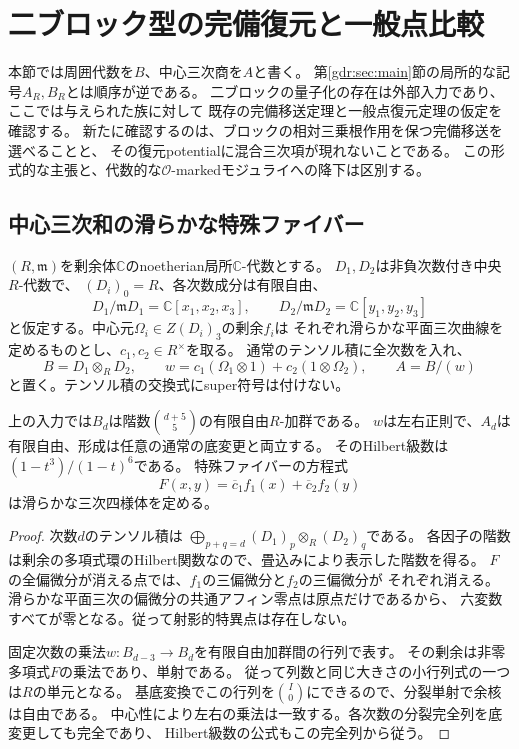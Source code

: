 \section{二ブロック型の完備復元と一般点比較}
\label{tbr:sec:recovery}

本節では周囲代数を$B$、中心三次商を$A$と書く。
第\ref{gdr:sec:main}節の局所的な記号$A_R,B_R$とは順序が逆である。
二ブロックの量子化の存在は外部入力であり、ここでは与えられた族に対して
既存の完備移送定理と一般点復元定理の仮定を確認する。
新たに確認するのは、ブロックの相対三乗根作用を保つ完備移送を選べることと、
その復元potentialに混合三次項が現れないことである。
この形式的な主張と、代数的な$\mathcal O$-markedモジュライへの降下は区別する。

\subsection{中心三次和の滑らかな特殊ファイバー}

$(R,\mathfrak m)$を剰余体$\mathbb C$のnoetherian局所$\mathbb C$-代数とする。
$D_1,D_2$は非負次数付き中央$R$-代数で、
$(D_i)_0=R$、各次数成分は有限自由、
\[
 D_1/\mathfrak mD_1=\mathbb C[x_1,x_2,x_3],\qquad
 D_2/\mathfrak mD_2=\mathbb C[y_1,y_2,y_3]
\]
と仮定する。中心元$\Omega_i\in Z(D_i)_3$の剰余$f_i$は
それぞれ滑らかな平面三次曲線を定めるものとし、$c_1,c_2\in R^\times$を取る。
通常のテンソル積に全次数を入れ、
\begin{equation}\label{tbr:eq:input}
 B=D_1\otimes_RD_2,\qquad
 w=c_1(\Omega_1\otimes1)+c_2(1\otimes\Omega_2),\qquad A=B/(w)
\end{equation}
と置く。テンソル積の交換式にsuper符号は付けない。

\begin{lemma}[二ブロック入力の次数別自由性と正則中心商]
\label{tbr:lem:input}
上の入力では$B_d$は階数$\binom{d+5}{5}$の有限自由$R$-加群である。
$w$は左右正則で、$A_d$は有限自由、形成は任意の通常の底変更と両立する。
そのHilbert級数は$(1-t^3)/(1-t)^6$である。
特殊ファイバーの方程式
\[
 F(x,y)=\overline c_1f_1(x)+\overline c_2f_2(y)
\]
は滑らかな三次四様体を定める。
\end{lemma}
\begin{proof}
次数$d$のテンソル積は
$\bigoplus_{p+q=d}(D_1)_p\otimes_R(D_2)_q$である。
各因子の階数は剰余の多項式環のHilbert関数なので、畳込みにより表示した階数を得る。
$F$の全偏微分が消える点では、$f_1$の三偏微分と$f_2$の三偏微分が
それぞれ消える。滑らかな平面三次の偏微分の共通アフィン零点は原点だけであるから、
六変数すべてが零となる。従って射影的特異点は存在しない。

固定次数の乗法$w:B_{d-3}\to B_d$を有限自由加群間の行列で表す。
その剰余は非零多項式$F$の乗法であり、単射である。
従って列数と同じ大きさの小行列式の一つは$R$の単元となる。
基底変換でこの行列を$\binom{I}{0}$にできるので、分裂単射で余核は自由である。
中心性により左右の乗法は一致する。各次数の分裂完全列を底変更しても完全であり、
Hilbert級数の公式もこの完全列から従う。
\end{proof}

